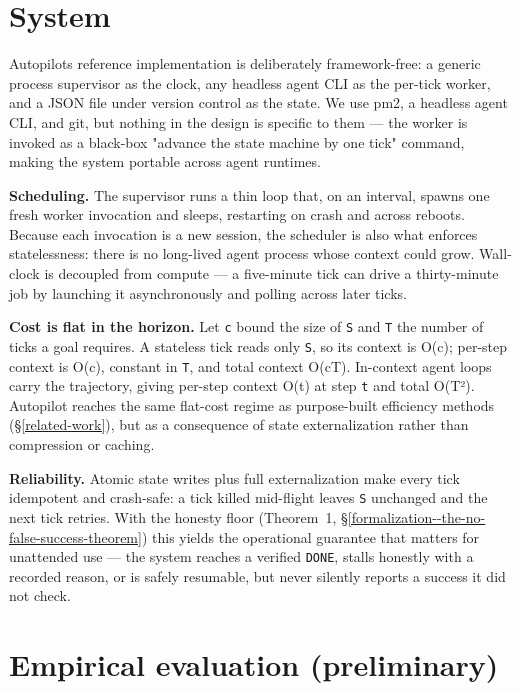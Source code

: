 \section{System}\label{system}

Autopilot\textquotesingle s reference implementation is deliberately framework-free: a generic process supervisor as
the clock, any headless agent CLI as the per-tick worker, and a JSON file under version control as the
state. We use pm2, a headless agent CLI, and git, but nothing in the design is specific to them --- the worker is
invoked as a black-box "advance the state machine by one tick" command, making the system portable
across agent runtimes.

\textbf{Scheduling.} The supervisor runs a thin loop that, on an interval, spawns one fresh worker
invocation and sleeps, restarting on crash and across reboots. Because each invocation is a new
session, the scheduler is also what enforces statelessness: there is no long-lived agent process whose
context could grow. Wall-clock is decoupled from compute --- a five-minute tick can drive a
thirty-minute job by launching it asynchronously and polling across later ticks.

\textbf{Cost is flat in the horizon.} Let \texttt{c} bound the size of \texttt{S} and \texttt{T} the number of ticks a goal
requires. A stateless tick reads only \texttt{S}, so its context is O(c); per-step context is O(c), constant
in \texttt{T}, and total context O(cT). In-context agent loops carry the trajectory, giving per-step context
O(t) at step \texttt{t} and total O(T²). Autopilot reaches the same flat-cost regime as purpose-built
efficiency methods (\S\ref{related-work}), but as a consequence of state externalization rather than compression or caching.

\textbf{Reliability.} Atomic state writes plus full externalization make every tick idempotent and
crash-safe: a tick killed mid-flight leaves \texttt{S} unchanged and the next tick retries. With the honesty
floor (Theorem~1, \S\ref{formalization--the-no-false-success-theorem}) this yields the operational guarantee that matters for unattended use --- the system reaches
a verified \texttt{DONE}, stalls honestly with a recorded reason, or is safely resumable, but never silently
reports a success it did not check.



\section{Empirical evaluation (preliminary)}\label{empirical-evaluation-preliminary}

